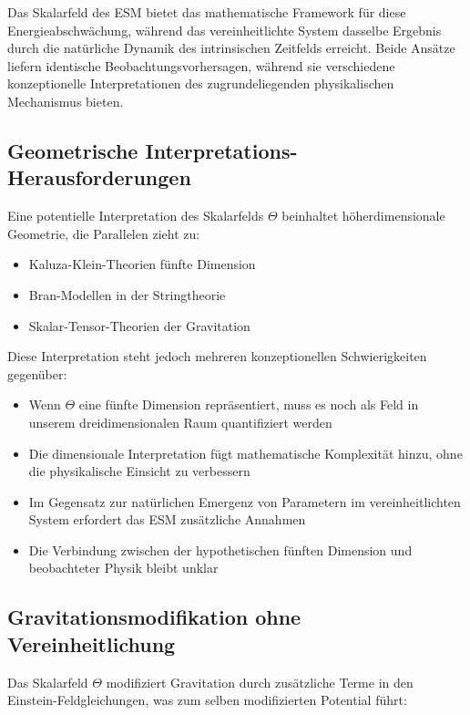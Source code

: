 	Das Skalarfeld des ESM bietet das mathematische Framework für diese Energieabschwächung, während das vereinheitlichte System dasselbe Ergebnis durch die natürliche Dynamik des intrinsischen Zeitfelds erreicht. Beide Ansätze liefern identische Beobachtungsvorhersagen, während sie verschiedene konzeptionelle Interpretationen des zugrundeliegenden physikalischen Mechanismus bieten.
	
	\subsection{Geometrische Interpretations-Herausforderungen}
	\label{subsec:geometrical_challenges}
	
	Eine potentielle Interpretation des Skalarfelds $\Theta$ beinhaltet höherdimensionale Geometrie, die Parallelen zieht zu:
	
	\begin{itemize}
		\item Kaluza-Klein-Theorien fünfte Dimension
		\item Bran-Modellen in der Stringtheorie
		\item Skalar-Tensor-Theorien der Gravitation
	\end{itemize}
	
	Diese Interpretation steht jedoch mehreren konzeptionellen Schwierigkeiten gegenüber:
	
	\begin{itemize}
		\item Wenn $\Theta$ eine fünfte Dimension repräsentiert, muss es noch als Feld in unserem dreidimensionalen Raum quantifiziert werden
		\item Die dimensionale Interpretation fügt mathematische Komplexität hinzu, ohne die physikalische Einsicht zu verbessern
		\item Im Gegensatz zur natürlichen Emergenz von Parametern im vereinheitlichten System erfordert das ESM zusätzliche Annahmen
		\item Die Verbindung zwischen der hypothetischen fünften Dimension und beobachteter Physik bleibt unklar
	\end{itemize}
	
	\subsection{Gravitationsmodifikation ohne Vereinheitlichung}
	\label{subsec:gravitational_modification_esm}
	
	Das Skalarfeld $\Theta$ modifiziert Gravitation durch zusätzliche Terme in den Einstein-Feldgleichungen, was zum selben modifizierten Potential führt:
	
